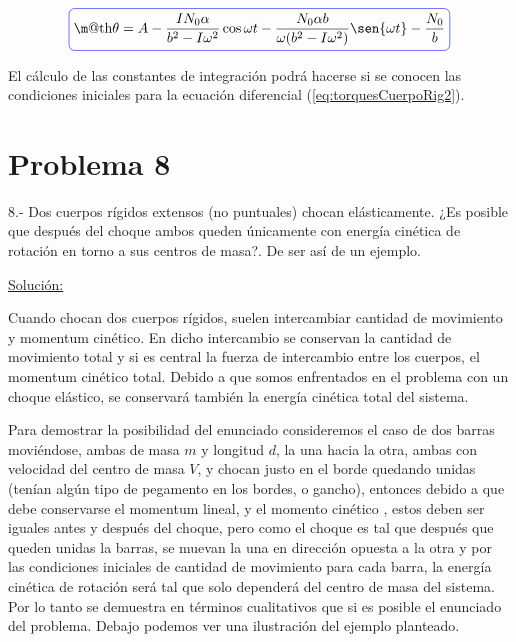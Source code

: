 \documentclass[a4paper,10pt]{article}
\makeatletter
\numberwithin{equation}{section}
\newcommand*{\boxcolor}{blue}
\renewcommand{\boxed}[1]{\textcolor{\boxcolor}{%
\tikz[baseline={([yshift=-1ex]current bounding box.center)}] \node [rectangle, minimum width=1ex,rounded corners,draw] {\normalcolor\m@th$\displaystyle#1$};}}
\makeatother
\begin{document}
\begin{equation}
 \boxed{\theta = A - \frac{IN_0 \alpha}{b^2-I\omega^2} \cos{\omega t} 
 - \frac{N_0 \alpha b}{\omega(b^2-I\omega^2)} \sen{\omega t} - \frac{N_0}{b}}
\end{equation}

El cálculo de las constantes de integración podrá hacerse si se conocen las condiciones iniciales
para la ecuación diferencial (\ref{eq:torquesCuerpoRig2}). 

\vspace{.3cm}

\section{Problema 8}
8.- Dos cuerpos rígidos extensos (no puntuales) chocan elásticamente. ¿Es posible que 
después del choque ambos queden únicamente con energía cinética de rotación en torno 
a sus centros de masa?. De ser así de un ejemplo.
\vspace{.3cm}

\underline{Solución:}\vspace{.3cm}

Cuando chocan dos cuerpos rígidos, suelen intercambiar cantidad de movimiento y momentum
cinético. En dicho intercambio se conservan la cantidad de movimiento total y si es central
la fuerza de intercambio entre los cuerpos, el momentum cinético total. Debido a que somos
enfrentados en el problema con un choque elástico, se conservará también la energía 
cinética total del sistema.

\vspace{.3cm}

Para demostrar la posibilidad del enunciado consideremos el caso de dos barras moviéndose,
ambas de masa $m$ y longitud $d$, la una hacia la otra, ambas con velocidad del centro de masa
$V$, y chocan justo en el borde quedando unidas (tenían algún tipo de pegamento en los bordes,
o gancho), entonces debido a que debe conservarse el momentum lineal, y el momento cinético
, estos deben ser iguales antes y después del choque, pero como el choque es tal que después
que queden unidas la barras, se muevan la una en dirección opuesta a la otra y por las condiciones
iniciales de cantidad de movimiento para cada barra, la energía cinética de rotación será
tal que solo dependerá del centro de masa del sistema. Por lo tanto se demuestra en términos
cualitativos que si es posible el enunciado del problema. Debajo podemos ver una ilustración
del ejemplo planteado.
\end{document}
